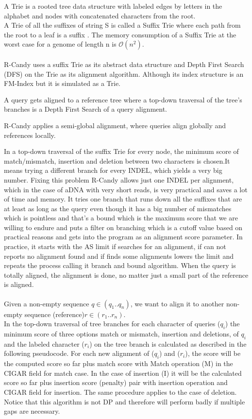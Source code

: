 \documentclass[11pt,a4paper]{report}
\begin{document}
A Trie is a rooted tree data structure with labeled edges 
by letters in the alphabet and nodes with concatenated 
characters from the root\cite{trie}.\\ 
A Trie of all the suffixes of string S is called a Suffix 
Trie where each path from the root to a leaf is a suffix 
\cite{gusfield1997algorithms}.
The memory consumption of a Suffix Trie at the worst case 
for a genome of length n is  $\mathcal{O} (n^{2})$.
\\\\

R-Candy uses a suffix Trie as its abstract data structure
and Depth First Search (DFS) on the Trie as its alignment algorithm.
Although its index structure is an FM-Index but it is simulated as a Trie.

A query gets aligned to a reference tree where a top-down traversal
of the tree's branches is a Depth First Search of a query alignment.

R-Candy applies a semi-global alignment, where queries 
align globally and  references locally.

In a top-down traversal of the suffix Trie for every node, the 
minimum score of match$/$mismatch, insertion and deletion between
two characters is chosen.It means trying a different branch for 
every INDEL, which yields a very big number. Fixing this problem 
R-Candy allows just one INDEL per alignment, which in the case
of aDNA with very short reads, is very practical and saves a lot of
time and memory. It tries one branch that runs down all the suffixes
that are at least as long as the query even though it has a big 
number of mismatches which is pointless and that's a bound which is
the maximum score that we are willing to endure and puts a filter on
branching which is a cutoff value based on practical reasons and gets
into the program as an alignment score parameter. In practice, it starts
with the AS limit if searches for an alignment, if can not reports no 
alignment found and if finds some alignments lowers the limit and repeats 
the process calling it branch and bound algorithm. When the query is 
totally aligned, the alignment is done, no matter just a small part of 
the reference is aligned.
\\\\
Given a non-empty sequence $q\in (q_{1}..q_{n})$, we want to align it to 
another non-empty sequence (reference)$r\in (r_{1}..r_{n})$.\\
In the top-down traversal of tree branches for each character 
of queries ($q_{i}$) the minimum score of three options match or mismatch, 
insertion and deletions, of $q_{i}$  and the labeled character ($r_{i}$)
on the tree branch is calculated as described in the following pseudocode.
For each new alignment of ($q_{i}$) and ($r_{i}$), the score will be the
computed score so far plus match score with Match operation (M) in the 
CIGAR field \cite{samtools} for match case. In the case of insertion (I) 
it will be the calculated score so far plus insertion score (penalty) pair 
with insertion operation and CIGAR field for insertion.
The same procedure applies to the case of deletion.
Notice that this algorithm is not DP and therefore will
perform badly if multiple gaps are necessary.\\
\end{document}
